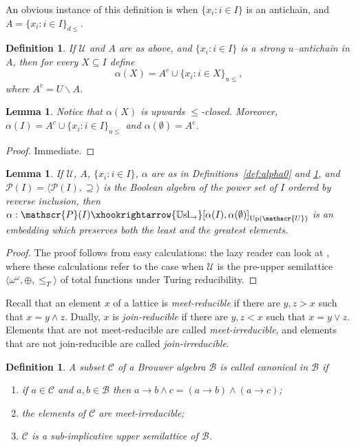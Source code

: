 \documentclass[11pt]{amsart}
\newtheorem{lemma}[theorem]{Lemma}
\newtheorem{defi}[theorem]{Definition}
\newenvironment{definition}{\begin{defi} \rm}{ \end{defi}}
\DeclareMathOperator{\up}{Up}
\newcommand{\Usl}{\mathbb{U}\textrm{sl}}
\begin{document}
An obvious instance of this definition is when $\{x_i: i \in I\}$ is an 
antichain, and $A = \{x_i: i \in I\}_{d\leq}$.  

\begin{definition}\label{def:alpha}
If $\mathscr{U}$ and $A$ are as above, and $\{x_i: i \in I\}$ is a strong 
$u$--antichain  in $A$,  then for every $X \subseteq I$ define 
\[
\alpha(X)=A^c \cup \{x_i: i \in X\}_{u\leq},
\]
where $A^c=U \smallsetminus A$. 
\end{definition}

\begin{lemma}\label{lem:alphab}
Notice that $\alpha(X)$ is upwards $\leq$-closed. Moreover, $\alpha(I)=A^c 
\cup \{x_i: i \in I\}_{u\leq}$ and $\alpha(\emptyset)=A^c$. 
\end{lemma}

\begin{proof} 
Immediate.
\end{proof}

\begin{lemma}\cite[Theorem~3.3]{Kuyper-Medvedev}\label{lem:algebraic}
If $\mathscr{U}$, $A$, $\{x_i: i \in I\}$, $\alpha$ are as in 
Definitions~\ref{def:alpha0} and \ref{def:alpha}, and $\mathscr{P}(I)=\langle 
\mathcal{P}(I), \supseteq \rangle$ is the Boolean algebra of the power set of 
$I$ ordered by reverse inclusion, then $\alpha: \mathscr{P}(I) 
\xhookrightarrow{\Usl_{ \rightarrow}} [\alpha(I), 
\alpha(\emptyset)]_{\up(\mathscr{U})}$ is an embedding which preserves both the least and the greatest elements. 
\end{lemma}

\begin{proof}
The proof follows from easy calculations: the lazy reader can look at 
\cite[Theorem~3.3]{Kuyper-Medvedev}, where these calculations  refer  to the 
case when $\mathscr{U}$ is the pre-upper semilattice $\langle \omega^\omega, 
\oplus,  \leq_T \rangle$ of total functions under Turing reducibility. 
\end{proof}

Recall that an element $x$ of a lattice is \emph{meet-reducible} if there are $y, z > x$
such that $x = y \wedge z$.  Dually, $x$ is \emph{join-reducible}  if there are $y, z < x$
such that $x = y \vee z$.  Elements that are not meet-reducible are called \emph{meet-irreducible},
and elements that are not join-reducible are called \emph{join-irreducible}.

\begin{definition}\cite{Skvortsova:intuitionism}\label{def:canonical}
A subset $\mathscr{C}$ of a Brouwer algebra $\mathscr{B}$ is called 
\emph{canonical in $\mathscr{B}$} if 
\begin{enumerate}
\item if $a \in \mathscr{C}$ and $a,b \in \mathscr{B}$ then $a \rightarrow 
    b \wedge c= (a\rightarrow b) \wedge (a\rightarrow c)$; 
  \item the elements of $\mathscr{C}$ are meet-irreducible; 
  \item $\mathscr{C}$ is a sub-implicative upper semilattice of 
      $\mathscr{B}$. 
\end{enumerate}
\end{definition}
\end{document}
